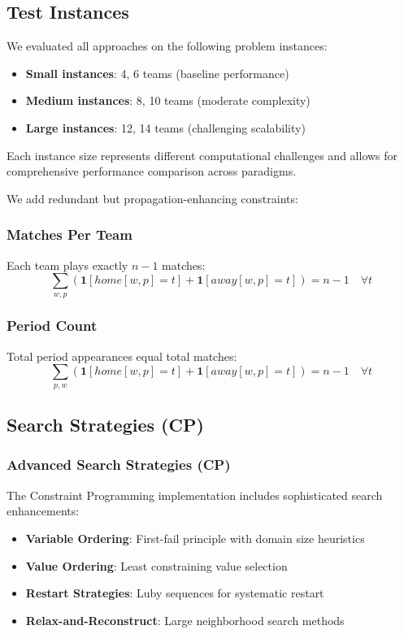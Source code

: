 \documentclass[11pt]{article}
\begin{document}
\begin{itemize}
\subsection{Test Instances}

We evaluated all approaches on the following problem instances:
\begin{itemize}
    \item \textbf{Small instances}: 4, 6 teams (baseline performance)
    \item \textbf{Medium instances}: 8, 10 teams (moderate complexity)
    \item \textbf{Large instances}: 12, 14 teams (challenging scalability)
\end{itemize}

Each instance size represents different computational challenges and allows for comprehensive performance comparison across paradigms.

We add redundant but propagation-enhancing constraints:

\subsubsection{Matches Per Team}
Each team plays exactly $n-1$ matches:
\begin{equation}
\sum_{w,p} (\mathbf{1}[home[w,p] = t] + \mathbf{1}[away[w,p] = t]) = n-1 \quad \forall t
\end{equation}

\subsubsection{Period Count}
Total period appearances equal total matches:
\begin{equation}
\sum_{p,w} (\mathbf{1}[home[w,p] = t] + \mathbf{1}[away[w,p] = t]) = n-1 \quad \forall t
\end{equation}

\subsection{Search Strategies (CP)}
\subsubsection{Advanced Search Strategies (CP)}

The Constraint Programming implementation includes sophisticated search enhancements:

\begin{itemize}
    \item \textbf{Variable Ordering}: First-fail principle with domain size heuristics
    \item \textbf{Value Ordering}: Least constraining value selection
    \item \textbf{Restart Strategies}: Luby sequences for systematic restart
    \item \textbf{Relax-and-Reconstruct}: Large neighborhood search methods
\end{itemize}


\end{itemize}
\end{document}
